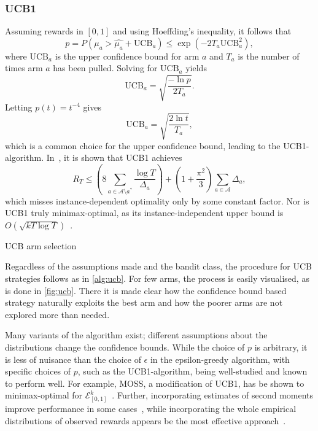 \subsubsection{UCB1}
Assuming rewards in $[0,1]$ and using Hoeffding's inequality, it follows that
\begin{equation}
    p
    = P(\mu_a > \hat{\mu_a} + \text{UCB}_a)
    \leq \exp(-2T_a \text{UCB}_a^2),
\end{equation}
where $\text{UCB}_a$ is the upper confidence bound for arm $a$ and $T_a$ is the number of times arm $a$ has been pulled.
Solving for $\text{UCB}_a$ yields
\begin{equation}
    \text{UCB}_a = \sqrt{\frac{-\ln p}{2T_a}}.
\end{equation}
Letting $p(t) = t^{-4}$ gives
\begin{equation}
    \text{UCB}_a = \sqrt{\frac{2 \ln t}{T_a}},
\end{equation}
which is a common choice for the upper confidence bound, leading to the UCB1-algorithm.
In~\autocite{auer2002}, it is shown that UCB1 achieves
\begin{equation}
    R_T
    \leq
    \left( 8 \sum_{a \in \mathcal{A} \setminus a^*} \frac{\log T}{\Delta_a} \right)
    + \left(1 + \frac{\pi^2}{3}\right) \sum_{a \in \mathcal{A}} \Delta_a,
\end{equation}
which misses instance-dependent optimality only by some constant factor.
Nor is UCB1 truly minimax-optimal, as its instance-independent upper bound is $O(\sqrt{kT \log T})$~\autocite{bubeck2012}.

\begin{algorithm}
    \caption{UCB arm selection}
    \label{alg:ucb}
     
\end{algorithm}


Regardless of the assumptions made and the bandit class, the procedure for UCB strategies follows as in \cref{alg:ucb}.
For few arms, the process is easily visualised, as is done in \cref{fig:ucb}.
There it is made clear how the confidence bound based strategy naturally exploits the best arm and how the poorer arms are not explored more than needed.

Many variants of the algorithm exist; different assumptions about the distributions change the confidence bounds.
While the choice of $p$ is arbitrary, it is less of nuisance than the choice of $\epsilon$ in the epsilon-greedy algorithm, with specific choices of $p$, such as the UCB1-algorithm, being well-studied and known to perform well.
For example, MOSS, a modification of UCB1, has be shown to minimax-optimal for $\mathcal{E}_{[0,1]}^k$~\autocite{audibert2009}.
Further, incorporating estimates of second moments improve performance in some cases~\autocite{audibert2009a}, while incorporating the whole empirical distributions of observed rewards appears be the most effective approach~\autocite{maillard2011}.


